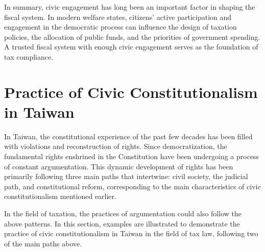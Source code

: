 \documentclass[]{article}
\begin{document}
In summary, civic engagement has long been an important factor in shaping the fiscal system. In modern welfare states, citizens' active participation and engagement in the democratic process can influence the design of taxation policies, the allocation of public funds, and the priorities of government spending. A trusted fiscal system with enough civic engagement serves as the foundation of tax compliance.










\section{Practice of Civic Constitutionalism in Taiwan}

In Taiwan, the constitutional experience of the past few decades has been filled with violations and reconstruction of rights. Since democratization, the fundamental rights enshrined in the Constitution have been undergoing a process of constant argumentation. This dynamic development of rights has been primarily following three main paths that intertwine: civil society, the judicial path, and constitutional reform, corresponding to the main characteristics of civic constitutionalism mentioned earlier.

In the field of taxation, the practices of argumentation could also follow the above patterns. In this section, examples are illustrated to demonstrate the practice of civic constitutionalism in Taiwan in the field of tax law, following two of the main paths above. 
\end{document}
